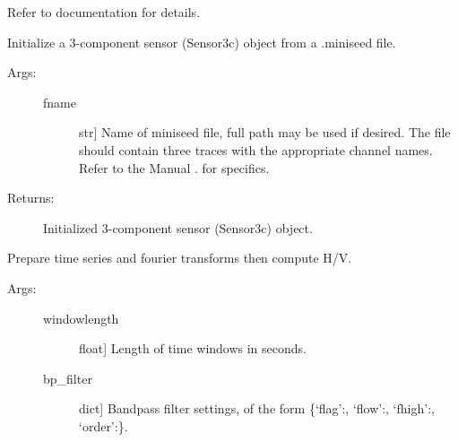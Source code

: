 \documentclass[letterpaper,10pt,english,openany,oneside]{sphinxmanual}
\begin{document}
\begin{fulllineitems}
\begin{fulllineitems}
Refer to  documentation for details.

\end{fulllineitems}


\begin{fulllineitems}
\label{\detokenize{index:hvsrpy.Sensor3c.from_mseed}}
Initialize a 3-component sensor (Sensor3c) object from a
.miniseed file.
\begin{description}
\item[{Args:}] \leavevmode\begin{description}
\item[{fname}] \leavevmode{[}str{]}
Name of miniseed file, full path may be used if desired.
The file should contain three traces with the 
appropriate channel names. Refer to the  Manual 
.
for specifics.

\end{description}

\item[{Returns:}] \leavevmode
Initialized 3-component sensor (Sensor3c) object.

\end{description}

\end{fulllineitems}


\begin{fulllineitems}
\label{\detokenize{index:hvsrpy.Sensor3c.hv}}
Prepare time series and fourier transforms then compute H/V.
\begin{description}
\item[{Args:}] \leavevmode\begin{description}
\item[{windowlength}] \leavevmode{[}float{]}
Length of time windows in seconds.

\item[{bp\_filter}] \leavevmode{[}dict{]}
Bandpass filter settings, of the form 
\{‘flag’:, ‘flow’:, ‘fhigh’:,
‘order’:\}.


\end{description}
\end{description}
\end{fulllineitems}
\end{fulllineitems}
\end{document}
